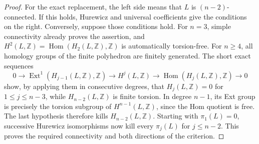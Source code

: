 \begin{proof}
For the exact replacement, the left side means that $L$ is $(n-2)$-connected. If this holds, Hurewicz and universal coefficients give the conditions on the right. Conversely, suppose those conditions hold. For $n=3$, simple connectivity already proves the assertion, and $H^2(L,\mathbb Z)=\operatorname{Hom}(H_2(L,\mathbb Z),\mathbb Z)$ is automatically torsion-free. For $n\geq4$, all homology groups of the finite polyhedron are finitely generated. The short exact sequences
\[
 0\longrightarrow\operatorname{Ext}^1(H_{j-1}(L,\mathbb Z),\mathbb Z)
 \longrightarrow H^j(L,\mathbb Z)
 \longrightarrow\operatorname{Hom}(H_j(L,\mathbb Z),\mathbb Z)
 \longrightarrow0
\]
show, by applying them in consecutive degrees, that $H_j(L,\mathbb Z)=0$ for $1\leq j\leq n-3$, while $H_{n-2}(L,\mathbb Z)$ is finite torsion. In degree $n-1$, its Ext group is precisely the torsion subgroup of $H^{n-1}(L,\mathbb Z)$, since the Hom quotient is free. The last hypothesis therefore kills $H_{n-2}(L,\mathbb Z)$. Starting with $\pi_1(L)=0$, successive Hurewicz isomorphisms now kill every $\pi_j(L)$ for $j\leq n-2$. This proves the required connectivity and both directions of the criterion.
\end{proof}
